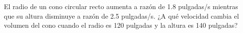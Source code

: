 \item El radio de un cono circular recto aumenta a razón de 1.8 pulgadas/s mientras que su altura disminuye a razón de 2.5 pulgadas/s. ¿A qué velocidad cambia el volumen del cono cuando el radio es 120 pulgadas y la altura es 140 pulgadas?

